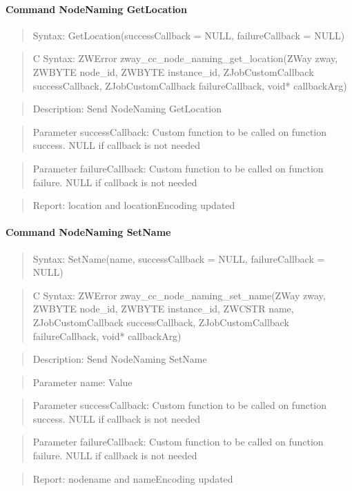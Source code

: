\paragraph{Command NodeNaming GetLocation}
\begin{quote}Syntax: GetLocation(successCallback = NULL, failureCallback = NULL)\end{quote}
\begin{quote}C Syntax: ZWError zway\_cc\_node\_naming\_get\_location(ZWay zway, ZWBYTE node\_id, ZWBYTE instance\_id, ZJobCustomCallback successCallback, ZJobCustomCallback failureCallback, void* callbackArg)\end{quote}
\begin{quote}Description: Send NodeNaming GetLocation\end{quote}
\begin{quote}Parameter successCallback: Custom function to be called on function success. NULL if callback is not needed\end{quote}
\begin{quote}Parameter failureCallback: Custom function to be called on function failure. NULL if callback is not needed\end{quote}
\begin{quote}Report: location and locationEncoding updated\end{quote}

\paragraph{Command NodeNaming SetName}
\begin{quote}Syntax: SetName(name, successCallback = NULL, failureCallback = NULL)\end{quote}
\begin{quote}C Syntax: ZWError zway\_cc\_node\_naming\_set\_name(ZWay zway, ZWBYTE node\_id, ZWBYTE instance\_id, ZWCSTR name, ZJobCustomCallback successCallback, ZJobCustomCallback failureCallback, void* callbackArg)\end{quote}
\begin{quote}Description: Send NodeNaming SetName\end{quote}
\begin{quote}Parameter name: Value\end{quote}
\begin{quote}Parameter successCallback: Custom function to be called on function success. NULL if callback is not needed\end{quote}
\begin{quote}Parameter failureCallback: Custom function to be called on function failure. NULL if callback is not needed\end{quote}
\begin{quote}Report: nodename and nameEncoding updated\end{quote}

